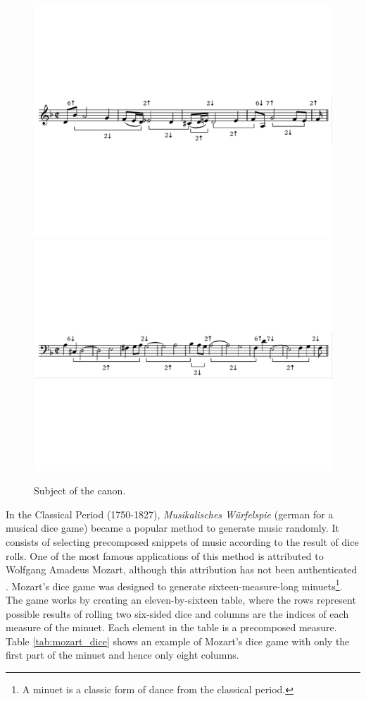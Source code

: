 \begin{figure}[!h]
 \centering
 \includegraphics[width=\columnwidth]{imgs/background/canon_b.pdf}
 \includegraphics[width=\columnwidth]{imgs/background/canon_c.pdf}
 \caption{Subject of the canon.}
 \label{fig:canon_subject}
\end{figure}

In the Classical Period (1750-1827), \textit{Musikalisches Würfelspie} (german for a musical dice game) became a popular method to generate music randomly. It consists of selecting precomposed snippets of music according to the result of dice rolls. One of the most famous applications of this method is attributed to Wolfgang Amadeus Mozart, although this attribution has not been authenticated \cite{cope1989experiments}. Mozart's dice game was designed to generate sixteen-measure-long minuets\footnote{A minuet is a classic form of dance from the classical period.}. The game works by creating an eleven-by-sixteen table, where the rows represent possible results of rolling two six-sided dice and columns are the indices of each measure of the minuet. Each element in the table is a precomposed measure. Table \ref{tab:mozart_dice} shows an example of Mozart's dice game with only the first part of the minuet and hence only eight columns.

